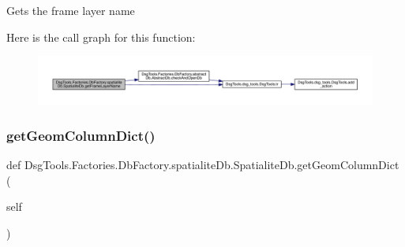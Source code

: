 \begin{DoxyVerb}Gets the frame layer name
\end{DoxyVerb}
 Here is the call graph for this function\+:
\nopagebreak
\begin{figure}[H]
\begin{center}
\leavevmode
\includegraphics[width=350pt]{class_dsg_tools_1_1_factories_1_1_db_factory_1_1spatialite_db_1_1_spatialite_db_a1566bb6fb78ce6c2a7866ee18775debd_cgraph}
\end{center}
\end{figure}
\mbox{\label{class_dsg_tools_1_1_factories_1_1_db_factory_1_1spatialite_db_1_1_spatialite_db_a06f70db683df58068e3a98c3a540ebba}} 
\subsubsection{\texorpdfstring{get\+Geom\+Column\+Dict()}{getGeomColumnDict()}}
{\footnotesize\ttfamily def Dsg\+Tools.\+Factories.\+Db\+Factory.\+spatialite\+Db.\+Spatialite\+Db.\+get\+Geom\+Column\+Dict (\begin{DoxyParamCaption}\item[{}]{self }\end{DoxyParamCaption})}

